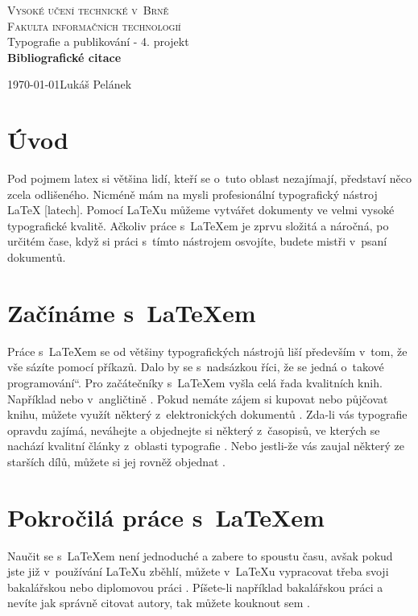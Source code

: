 \documentclass[11pt, a4paper]{article}
\newcommand{\myuv}[1]{\quotedblbase #1\textquotedblleft}
\begin{document}
\begin{titlepage}

\begin{center}
	\Huge
 	\textsc{Vysoké učení technické v~Brně\\
 		{\huge Fakulta informačních technologií}}\\
 		
	\LARGE
	 Typografie a publikování - 4. projekt\\ 
	 	\textbf{{\huge Bibliografické citace}}
\end{center}

{\Large \today \hfill Lukáš Pelánek}
\end{titlepage}


\section*{Úvod} 
Pod pojmem latex si většina lidí, kteří se o~tuto oblast nezajímají, představí něco zcela odlišeného. Nicméně mám na mysli profesionální typografický nástroj {\LaTeX} [latech]. Pomocí {\LaTeX}u můžeme vytvářet dokumenty ve velmi vysoké typografické kvalitě. Ačkoliv práce s~{\LaTeX}em je zprvu složitá a náročná, po určitém čase, když si práci s~tímto nástrojem osvojíte, budete mistři v~psaní dokumentů.

\section*{Začínáme s~{\LaTeX}em}
Práce s~{\LaTeX}em se od většiny typografických nástrojů liší především v~tom, že vše sázíte pomocí příkazů. Dalo by se s~nadsázkou říci, že se jedná o~takové \myuv{programování}. Pro začátečníky s~{\LaTeX}em vyšla celá řada kvalitních knih. Například \cite{latex_zacatecnici} nebo v~angličtině \cite{latex_guide}. Pokud nemáte zájem si kupovat nebo půjčovat knihu, můžete využít některý z~elektronických dokumentů \cite{tex} \cite{getting}. Zda-li vás typografie opravdu zajímá, neváhejte a objednejte si některý z~časopisů, ve kterých se nachází kvalitní články z~oblasti typografie \cite{typografia} \cite{typo2}. Nebo jestli-že vás zaujal některý ze starších dílů, můžete si jej rovněž objednat \cite{typo}.
  
\section*{Pokročilá práce s~{\LaTeX}em}
Naučit se s~{\LaTeX}em není jednoduché a zabere to spoustu času, avšak pokud jste již v~používání {\LaTeX}u zběhlí, můžete v~{\LaTeX}u vypracovat třeba svoji bakalářskou nebo diplomovou práci\cite{bibtex} \cite{rozpoznavani}. Píšete-li například bakalářskou práci a nevíte jak správně citovat autory, tak můžete kouknout sem \cite{martinek}.
\end{document}
